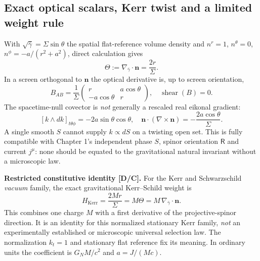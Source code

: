 \documentclass[11pt,a4paper]{article}
\begin{document}
\subsection{Exact optical scalars, Kerr twist and a limited weight rule}
With $\sqrt{\bar\gamma}=\Sigma\sin\theta$ the spatial flat-reference volume density and $n^r=1$, $n^\theta=0$, $n^\phi=-a/(r^2+a^2)$, direct calculation gives
\begin{equation}\label{eq:v12-expansion}
\boxed{\Theta:=\nabla_{\!\bar\gamma}\!\cdot\boldsymbol n=\frac{2r}{\Sigma}.}
\end{equation}
In a screen orthogonal to $\boldsymbol n$ the optical derivative is, up to screen orientation,
\begin{equation}\label{eq:v12-optical}
\boxed{B_{AB}=\frac1\Sigma\begin{pmatrix}r&a\cos\theta\\-a\cos\theta&r\end{pmatrix},\quad
\operatorname{shear}(B)=0.}
\end{equation}
The spacetime-null covector is \emph{not} generally a rescaled real eikonal gradient:
\begin{equation}\label{eq:v12-twist}
[k\wedge dk]_{t\theta\phi}=-2a\sin\theta\cos\theta,
\quad \boldsymbol n\cdot(\nabla\times\boldsymbol n)=-\frac{2a\cos\theta}{\Sigma}.
\end{equation}
A single smooth $S$ cannot supply $k\propto dS$ on a twisting open set. This is fully compatible with Chapter 1's independent phase $S$, spinor orientation $\mathsf R$ and current $j^\mu$: none should be equated to the gravitational natural invariant without a microscopic law.

\textbf{Restricted constitutive identity [D/C].} For the Kerr and Schwarzschild \emph{vacuum} family, the exact gravitational Kerr--Schild weight is
\begin{equation}\label{eq:v12-H-expansion}
\boxed{H_{\mathrm{Kerr}}=\frac{2Mr}{\Sigma}=M\Theta=M\,\nabla_{\!\bar\gamma}\!\cdot\boldsymbol n.}
\end{equation}
This combines one charge $M$ with a first derivative of the projective-spinor direction. It is an identity for this normalized stationary Kerr family, \emph{not} an experimentally established or microscopic universal selection law. The normalization $k_t=1$ and stationary flat reference fix its meaning. In ordinary units the coefficient is $G_NM/c^2$ and $a=J/(Mc)$.
\end{document}
